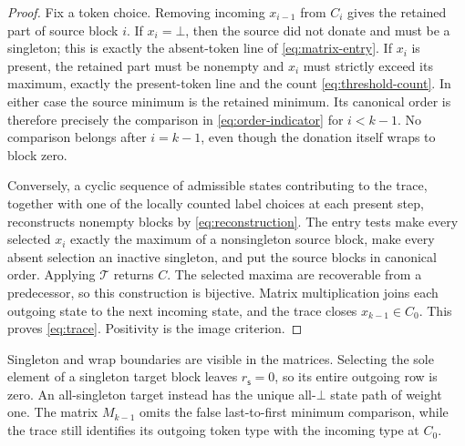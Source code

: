 \documentclass[a4paper,10pt]{amsart}
\theoremstyle{definition}
\theoremstyle{remark}
\newcommand{\T}{\mathcal T}
\newcommand{\botstate}{\bot}
\begin{document}
\begin{proof}
Fix a token choice.  Removing incoming $x_{i-1}$ from $C_i$ gives the retained
part of source block $i$.  If $x_i=\botstate$, then the source did not donate
and must be a singleton; this is exactly the absent-token line of
\eqref{eq:matrix-entry}.  If $x_i$ is present, the retained part must be
nonempty and $x_i$ must strictly exceed its maximum, exactly the present-token line
and the count \eqref{eq:threshold-count}.  In either case the source minimum
is the retained minimum.  Its canonical order is therefore precisely the
comparison in \eqref{eq:order-indicator} for $i<k-1$.  No comparison belongs
after $i=k-1$, even though the donation itself wraps to block zero.

Conversely, a cyclic sequence of admissible states contributing to the trace,
together with one of the locally counted label choices at each present step,
reconstructs nonempty blocks by \eqref{eq:reconstruction}.  The entry tests
make every selected $x_i$ exactly the maximum of a nonsingleton source block,
make every absent selection an inactive singleton, and put the source blocks
in canonical order.  Applying $\T$ returns $C$.  The selected maxima are
recoverable from a predecessor, so this construction is bijective.  Matrix
multiplication joins each outgoing state to the next incoming state, and the
trace closes $x_{k-1}\in C_0$.  This proves \eqref{eq:trace}.  Positivity is
the image criterion.
\end{proof}

Singleton and wrap boundaries are visible in the matrices.  Selecting the
sole element of a singleton target block leaves $r_{\mathsf{s}}=0$, so its
entire outgoing row is zero.  An all-singleton target instead has the unique
all-$\botstate$ state path of weight one.  The matrix $M_{k-1}$ omits the
false last-to-first minimum comparison, while the trace still identifies its
outgoing token type with the incoming type at $C_0$.
\end{document}
